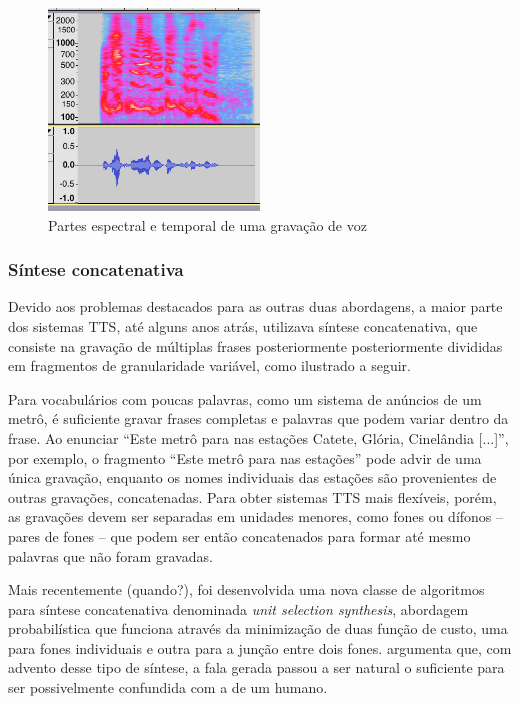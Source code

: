 \begin{figure}
  \centering
    \includegraphics[width=0.5\textwidth]{Imagens/espectro.png}
  \caption{Partes espectral e temporal de uma gravação de voz}
\end{figure}


\subsubsection{Síntese concatenativa}
Devido aos problemas destacados para as outras duas abordagens, a maior parte
dos sistemas TTS, até alguns anos atrás, utilizava síntese concatenativa, que
consiste na gravação de múltiplas frases posteriormente posteriormente divididas
em fragmentos de granularidade variável, como ilustrado a seguir.

Para vocabulários com poucas palavras, como um sistema de anúncios de um metrô, é
suficiente gravar frases completas e palavras que podem variar dentro da frase.
Ao enunciar ``Este metrô para nas estações Catete, Glória, Cinelândia [...]'',
por exemplo, o fragmento ``Este metrô para nas estações'' pode advir de uma
única gravação, enquanto os nomes individuais das estações são provenientes de
outras gravações, concatenadas. Para obter sistemas TTS mais flexíveis, porém,
as gravações devem ser separadas em unidades menores, como fones ou dífonos --
 pares de fones -- que podem ser então concatenados para formar até mesmo
palavras que não foram gravadas.

Mais recentemente (quando?), foi desenvolvida uma nova classe de algoritmos para
síntese concatenativa denominada \emph{unit selection synthesis}, abordagem
probabilística que funciona através da minimização de duas função de custo, uma
para fones individuais e outra para a junção entre dois fones.
 argumenta que, com advento desse tipo de síntese, a fala
gerada passou a ser natural o suficiente para ser possivelmente confundida com a de um humano.

